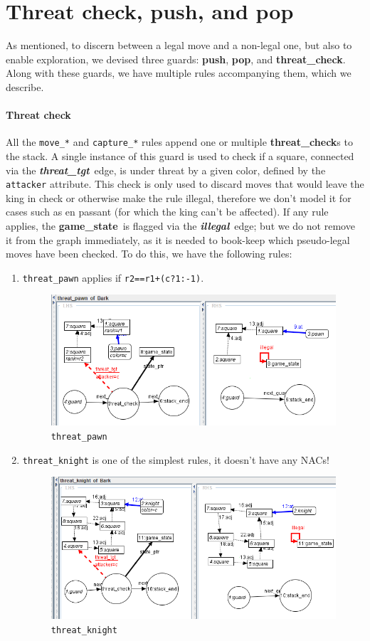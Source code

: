 \documentclass[a4paper, 10pt]{scrartcl}
\newcommand{\noderepr}[1]{\textsf{\textbf{#1}}}
\newcommand{\edgerepr}[1]{\textit{\textbf{#1}}}
\newcommand{\gamestate}{\noderepr{game\_state}}
\newcommand{\push}{\noderepr{push}}
\newcommand{\pop}{\noderepr{pop}}
\newcommand{\threatcheck}{\noderepr{threat\_check}}
\newcommand{\threattgt}{\edgerepr{threat\_tgt}}
\newcommand{\illegal}{\edgerepr{illegal}}
\begin{document}
    \section{Threat check, push, and pop}
    As mentioned, to discern between a legal move and a non-legal one, but also to enable exploration, we devised three guards: \push, \pop, and \threatcheck.
    Along with these guards, we have multiple rules accompanying them, which we describe.
    \paragraph*{Threat check} All the \texttt{move\_*} and \texttt{capture\_*} rules append one or multiple \threatcheck s to the stack. A single instance of this guard is used to check if a square, connected via the \threattgt\ edge, is under threat by a given color, defined by the \texttt{attacker} attribute. This check is only used to discard moves that would leave the king in check or otherwise make the rule illegal, therefore we don't model it for cases such as en passant (for which the king can't be affected).
    If any rule applies, the \gamestate\ is flagged via the \illegal\ edge; but we do not remove it from the graph immediately, as it is needed to book-keep which pseudo-legal moves have been checked.
    To do this, we have the following rules:
    \begin{enumerate}
        \item \texttt{threat\_pawn} applies if \texttt{r2==r1+(c?1:-1)}.
        \begin{figure}[H]
            \centering
            \includegraphics[width=.8\linewidth]{images/threat_pawn.png}
            \caption{\texttt{threat\_pawn}}
        \end{figure}
        \item \texttt{threat\_knight} is one of the simplest rules, it doesn't have any NACs!
        \begin{figure}[H]
            \centering
            \includegraphics[width=.8\linewidth]{images/threat_knight.png}
            \caption{\texttt{threat\_knight}}
        \end{figure}
    \end{enumerate}
\end{document}
